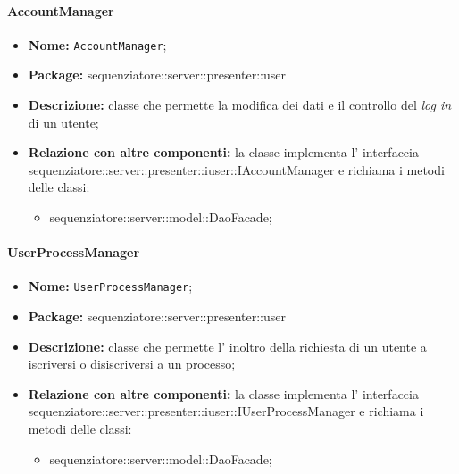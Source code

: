 \paragraph{AccountManager}
	\begin{itemize}
		\item \textbf{Nome:} \texttt{AccountManager};
		\item \textbf{Package:} sequenziatore::server::presenter::user
		\item \textbf{Descrizione:} classe che permette la modifica dei dati e il controllo del \textit{log in} di un utente;
		\item \textbf{Relazione con altre componenti:} la classe implementa l' interfaccia sequenziatore::server::presenter::iuser::IAccountManager e richiama i metodi delle classi:
		\begin{itemize}
			\item sequenziatore::server::model::DaoFacade;
		\end{itemize}
	\end{itemize}
\paragraph{UserProcessManager}
	\begin{itemize}
		\item \textbf{Nome:} \texttt{UserProcessManager};
		\item \textbf{Package:} sequenziatore::server::presenter::user
		\item \textbf{Descrizione:} classe che permette l' inoltro della richiesta di un utente a iscriversi o disiscriversi a un processo;
		\item \textbf{Relazione con altre componenti:} la classe implementa l' interfaccia sequenziatore::server::presenter::iuser::IUserProcessManager e richiama i metodi delle classi:
		\begin{itemize}
			\item sequenziatore::server::model::DaoFacade;
		\end{itemize}
	\end{itemize}

